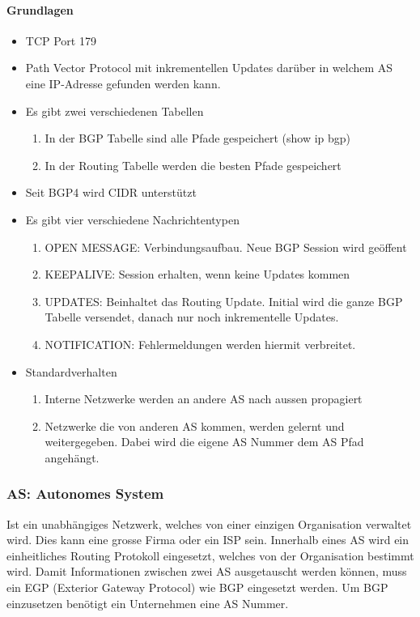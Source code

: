 \paragraph{Grundlagen}
\begin{itemize}
	\item TCP Port 179
	\item Path Vector Protocol mit inkrementellen Updates darüber in welchem AS eine IP-Adresse gefunden werden kann.
	\item Es gibt zwei verschiedenen Tabellen
	\begin{enumerate}
		\item In der BGP Tabelle sind alle Pfade gespeichert (show ip bgp)
		\item In der Routing Tabelle werden die besten Pfade gespeichert
	\end{enumerate} 
	\item Seit BGP4 wird CIDR unterstützt
	\item Es gibt vier verschiedene Nachrichtentypen
	\begin{enumerate}
		\item OPEN MESSAGE: Verbindungsaufbau. Neue BGP Session wird geöffent
		\item KEEPALIVE: Session erhalten, wenn keine Updates kommen
		\item UPDATES: Beinhaltet das Routing Update. Initial wird die ganze BGP Tabelle versendet, danach nur noch inkrementelle Updates.
		\item NOTIFICATION: Fehlermeldungen werden hiermit verbreitet.
	\end{enumerate}
	\item Standardverhalten
	\begin{enumerate}
		\item Interne Netzwerke werden an andere AS nach aussen propagiert
		\item Netzwerke die von anderen AS kommen, werden gelernt und weitergegeben. Dabei wird die eigene AS Nummer dem AS Pfad angehängt.
	\end{enumerate}
\end{itemize}

\subsubsection{AS: Autonomes System} Ist ein unabhängiges Netzwerk, welches von einer einzigen Organisation verwaltet wird. Dies kann eine grosse Firma oder ein ISP sein. Innerhalb eines AS wird ein einheitliches Routing Protokoll eingesetzt, welches von der Organisation bestimmt wird. Damit Informationen zwischen zwei AS ausgetauscht werden können, muss ein EGP (Exterior Gateway Protocol) wie BGP eingesetzt werden. Um BGP einzusetzen benötigt ein Unternehmen eine AS Nummer. 

